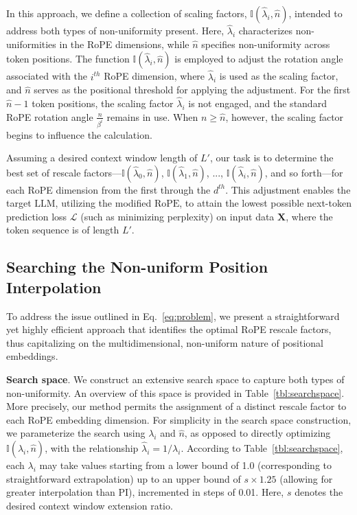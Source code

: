 In this approach, we define a collection of scaling factors, $\mathbb{I}(\hat{\lambda}_{i},\hat{n})$, intended to address both types of non-uniformity present. Here, $\hat{\lambda}_i$ characterizes non-uniformities in the RoPE dimensions, while $\hat{n}$ specifies non-uniformity across token positions. The function $\mathbb{I}(\hat{\lambda}_{i},\hat{n})$ is employed to adjust the rotation angle associated with the $i^{th}$ RoPE dimension, where $\hat{\lambda}_i$ is used as the scaling factor, and $\hat{n}$ serves as the positional threshold for applying the adjustment. For the first $\hat{n}-1$ token positions, the scaling factor $\hat{\lambda}_i$ is not engaged, and the standard RoPE rotation angle $\frac{n}{\beta^i}$ remains in use. When $n\ge\hat{n}$, however, the scaling factor begins to influence the calculation.

Assuming a desired context window length of $L'$, our task is to determine the best set of rescale factors—$\mathbb{I}(\hat{\lambda}_{0},\hat{n})$, $\mathbb{I}(\hat{\lambda}_{1},\hat{n})$, ..., $\mathbb{I}(\hat{\lambda}_{i},\hat{n})$, and so forth—for each RoPE dimension from the first through the $d^{th}$. This adjustment enables the target $\text{LLM}$, utilizing the modified $\text{RoPE}$, to attain the lowest possible next-token prediction loss $\mathcal{L}$ (such as minimizing perplexity) on input data $\mathbf{X}$, where the token sequence is of length $L'$.

\subsection{Searching the Non-uniform Position Interpolation}

To address the issue outlined in Eq.~\ref{eq:problem}, we present a straightforward yet highly efficient approach that identifies the optimal RoPE rescale factors, thus capitalizing on the multidimensional, non-uniform nature of positional embeddings.

\textbf{Search space}. We construct an extensive search space to capture both types of non-uniformity. An overview of this space is provided in Table~\ref{tbl:searchspace}. More precisely, our method permits the assignment of a distinct rescale factor to each RoPE embedding dimension. For simplicity in the search space construction, we parameterize the search using $\lambda_i$ and $\hat{n}$, as opposed to directly optimizing $\mathbb{I}(\hat{\lambda}_{i},\hat{n})$, with the relationship $\hat{\lambda}_{i}=1/\lambda_i$. According to Table~\ref{tbl:searchspace}, each $\lambda_i$ may take values starting from a lower bound of 1.0 (corresponding to straightforward extrapolation) up to an upper bound of $s\times1.25$ (allowing for greater interpolation than PI), incremented in steps of 0.01. Here, $s$ denotes the desired context window extension ratio.

